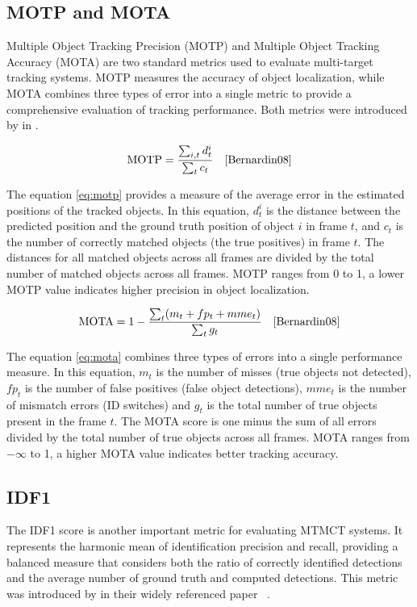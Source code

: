 \subsection{MOTP and MOTA}\label{subsec:motp_mota}
Multiple Object Tracking Precision (MOTP) and Multiple Object Tracking Accuracy (MOTA) are two standard metrics used to evaluate multi-target tracking systems. MOTP measures the accuracy of object localization, while MOTA combines three types of error into a single metric to provide a comprehensive evaluation of tracking performance. Both metrics were introduced by \textcite{Bernardin08} in \citeyear{Bernardin08}.

\begin{equation}
    \label{eq:motp}
    \text{MOTP}=\frac{\sum_{i, t} d_t^i}{\sum_t c_t}
    \quad\text{\cite[Eq.~1]{Bernardin08}}
\end{equation}

The equation \ref{eq:motp} provides a measure of the average error in the estimated positions of the tracked objects. In this equation, \(d_t^i\) is the distance between the predicted position and the ground truth position of object \(i\) in frame \(t\), and \(c_t\) is the number of correctly matched objects (the true positives) in frame \(t\). The distances for all matched objects across all frames are divided by the total number of matched objects across all frames. MOTP ranges from 0 to 1, a lower MOTP value indicates higher precision in object localization.

\begin{equation}
    \label{eq:mota}
    \text{MOTA}=1-\frac{\sum_t (m_t+fp_t+mme_t)}{\sum_t g_t}
    \quad\text{\cite[Eq.~2]{Bernardin08}}
\end{equation}

The equation \ref{eq:mota} combines three types of errors into a single performance measure. In this equation, \(m_t\) is the number of misses (true objects not detected), \(fp_t\) is the number of false positives (false object detections), \(mme_t\) is the number of mismatch errors (ID switches) and \(g_t\) is the total number of true objects present in the frame \(t\). The MOTA score is one minus the sum of all errors divided by the total number of true objects across all frames. MOTA ranges from \(-\infty\) to 1, a higher MOTA value indicates better tracking accuracy.

\subsection{IDF1}\label{subsec:idf1}
The IDF1 score is another important metric for evaluating MTMCT systems. It represents the harmonic mean of identification precision and recall, providing a balanced measure that considers both the ratio of correctly identified detections and the average number of ground truth and computed detections. This metric was introduced by \citeauthor{Ristani16} in their widely referenced paper ~\cite{Ristani16}.

